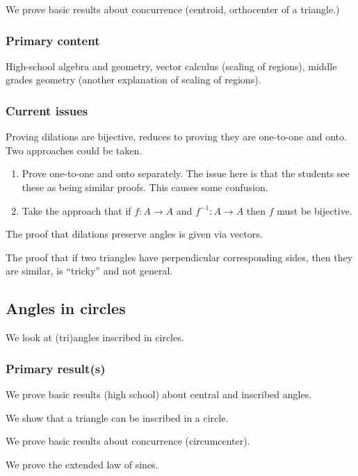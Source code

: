 \documentclass{amsart}
\begin{document}
We prove basic results about concurrence (centroid, orthocenter of a triangle.)

\subsubsection{Primary content}

High-school algebra and geometry, vector calculus (scaling of
regions), middle grades geometry (another explanation of scaling of
regions).

\subsubsection{Current issues}

Proving dilations are bijective, reduces to proving they are
one-to-one and onto. Two approaches could be taken.
\begin{enumerate}
\item Prove one-to-one and onto separately. The issue here is that the students see these as being similar proofs. This causes some confusion.
\item Take the approach that if $f:A\to A$ and $f^{-1}:A\to A$ then $f$ must be bijective.
\end{enumerate}

The proof that dilations preserve angles is given via vectors.

The proof that if two triangles have perpendicular corresponding sides, then they are similar, is ``tricky'' and not general. 


\subsection{Angles in circles}

We look at (tri)angles inscribed in circles.

\subsubsection{Primary result(s)}

We prove basic results (high school) about central and inscribed angles.

We show that a triangle can be inscribed in a circle.

We prove basic results about concurrence (circumcenter).

We prove the extended law of sines.
\end{document}
